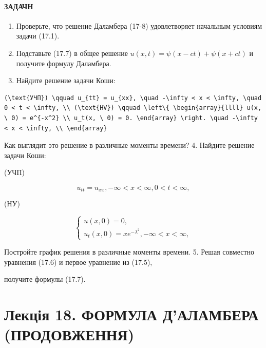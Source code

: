 \documentclass[
  ukrainian,
]{article}
\begin{document}
\paragraph{ЗАДАЧН}\label{ux437ux430ux434ux430ux447ux43d}

\begin{enumerate}
\def\labelenumi{\arabic{enumi}.}
\item
  Проверьте, что решение Даламбера (17-8) удовлетворяет начальным
  условиям задачи (17.1).
\item
  Подставьте (17.7) в общее решение
  \(u(x, t) = \psi(x - ct) + \psi(x + ct)\) и получите формулу
  Даламбера.
\item
  Найдите решение задачи Коши:
\end{enumerate}

\begin{verbatim}
(\text{УЧП}) \qquad u_{tt} = u_{xx}, \quad -\infty < x < \infty, \quad 0 < t < \infty, \\ (\text{HV}) \qquad \left\{ \begin{array}{llll} u(x, \ 0) = e^{-x^2} \\ u_t(x, \ 0) = 0. \end{array} \right. \quad -\infty < x < \infty, \\ \end{array}
\end{verbatim}

Как выглядит это решение в различные моменты времени? 4. Найдите решение
задачи Коши:

(УЧП)

\[
u_{tt} = u_{xx}, -\infty < x < \infty, 0 < t < \infty,
\]

(НУ)

\[
\begin{cases} u(x, 0) = 0, \\ u_t(x, 0) = xe^{-\lambda^2}, -\infty < x < \infty, \end{cases}
\]

Постройте график решения в различные моменты времени. 5. Решая совместно
уравнения (17.6) и первое уравнение из (17.5),

получите формулы (17.7).

\section{Лекція 18. ФОРМУЛА Д'АЛАМБЕРА
(ПРОДОВЖЕННЯ)}\label{ux43bux435ux43aux446ux456ux44f-18.-ux444ux43eux440ux43cux443ux43bux430-ux434ux430ux43bux430ux43cux431ux435ux440ux430-ux43fux440ux43eux434ux43eux432ux436ux435ux43dux43dux44f}
\end{document}
